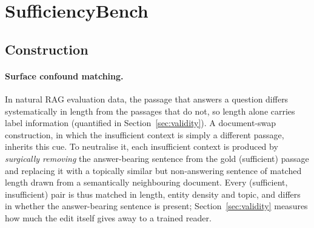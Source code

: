 \documentclass[acmsmall,screen,review]{acmart}
\newcommand{\bench}{SufficiencyBench}
\begin{document}
\section{\bench{}}
\label{sec:benchmark}

\subsection{Construction}
\label{sec:construction}

\paragraph{Surface confound matching.}
In natural RAG evaluation data, the passage that answers a question differs systematically in length from the passages that do not, so length alone carries label information (quantified in Section~\ref{sec:validity}). A document-swap construction, in which the insufficient context is simply a different passage, inherits this cue. To neutralise it, each insufficient context is produced by \emph{surgically removing} the answer-bearing sentence from the gold (sufficient) passage and replacing it with a topically similar but non-answering sentence of matched length drawn from a semantically neighbouring document. Every (sufficient, insufficient) pair is thus matched in length, entity density and topic, and differs in whether the answer-bearing sentence is present; Section~\ref{sec:validity} measures how much the edit itself gives away to a trained reader.
\end{document}
